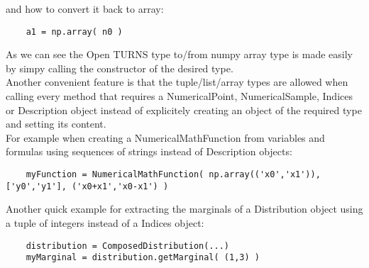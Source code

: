 and how to convert it back to array:
\begin{center}
  \begin{lstlisting}
    a1 = np.array( n0 )
  \end{lstlisting}
\end{center}

As we can see the Open TURNS type to/from numpy array type is made easily by simpy calling the constructor of the desired type.\\
Another convenient feature is that the tuple/list/array types are allowed when calling every method that requires a NumericalPoint, NumericalSample, Indices or Description object
instead of explicitely creating an object of the required type and setting its content.\\

For example when creating a NumericalMathFunction from variables and formulas using sequences of strings instead of Description objects:
\begin{center}
  \begin{lstlisting}
    myFunction = NumericalMathFunction( np.array(('x0','x1')), ['y0','y1'], ('x0+x1','x0-x1') )
  \end{lstlisting}
\end{center}

Another quick example for extracting the marginals of a Distribution object using a tuple of integers instead of a Indices object:
\begin{center}
  \begin{lstlisting}
    distribution = ComposedDistribution(...)
    myMarginal = distribution.getMarginal( (1,3) )
  \end{lstlisting}
\end{center}

